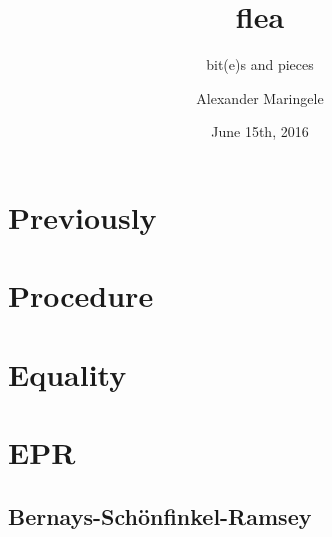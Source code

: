 



\author{Alexander Maringele}
\title{flea\\
}
\subtitle{bit(e)s and pieces}
\date{June 15th, 2016}

%



 

%

\frame{
	\setcounter{tocdepth}{1}
	\tableofcontents}

%

%


\section{Previously}



\section{Procedure}



\section{Equality}


\section[Effectively Propositional]{EPR}

\subsection{Bernays-Sch\"onfinkel-Ramsey}


